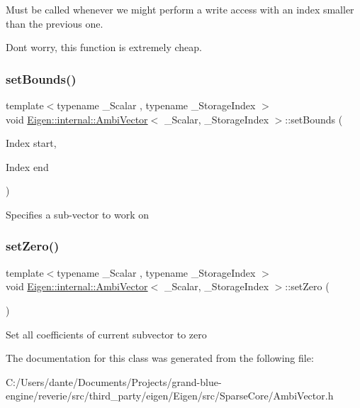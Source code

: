 Must be called whenever we might perform a write access with an index smaller than the previous one.

Don\textquotesingle{}t worry, this function is extremely cheap. \mbox{\label{class_eigen_1_1internal_1_1_ambi_vector_a8a37e06682a29a63239d914de342096c}} 
\subsubsection{\texorpdfstring{setBounds()}{setBounds()}}
{\footnotesize\ttfamily template$<$typename \+\_\+\+Scalar , typename \+\_\+\+Storage\+Index $>$ \\
void \mbox{\hyperlink{class_eigen_1_1internal_1_1_ambi_vector}{Eigen\+::internal\+::\+Ambi\+Vector}}$<$ \+\_\+\+Scalar, \+\_\+\+Storage\+Index $>$\+::set\+Bounds (\begin{DoxyParamCaption}\item[{Index}]{start,  }\item[{Index}]{end }\end{DoxyParamCaption})\hspace{0.3cm}{\ttfamily [inline]}}

Specifies a sub-\/vector to work on \mbox{\label{class_eigen_1_1internal_1_1_ambi_vector_af472b476758307bcc1621d9eb4018f6a}} 
\subsubsection{\texorpdfstring{setZero()}{setZero()}}
{\footnotesize\ttfamily template$<$typename \+\_\+\+Scalar , typename \+\_\+\+Storage\+Index $>$ \\
void \mbox{\hyperlink{class_eigen_1_1internal_1_1_ambi_vector}{Eigen\+::internal\+::\+Ambi\+Vector}}$<$ \+\_\+\+Scalar, \+\_\+\+Storage\+Index $>$\+::set\+Zero (\begin{DoxyParamCaption}{ }\end{DoxyParamCaption})}

Set all coefficients of current subvector to zero 

The documentation for this class was generated from the following file\+:\begin{DoxyCompactItemize}
\item 
C\+:/\+Users/dante/\+Documents/\+Projects/grand-\/blue-\/engine/reverie/src/third\+\_\+party/eigen/\+Eigen/src/\+Sparse\+Core/Ambi\+Vector.\+h\end{DoxyCompactItemize}
